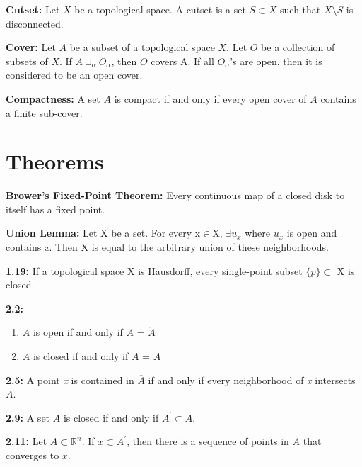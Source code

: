 \documentclass[letterpaper,12pt]{article}
\begin{document}
	\textbf{Cutset:}
		Let $X$ be a topological space. A cutset is a set $S\subset X$ such that $X\setminus S$ is disconnected.
	\newline{} 

	\textbf{Cover:}
		Let $A$ be a subset of a topological space $X$. Let $O$ be a collection of subsets of $X$. If $A\sqcup_\alpha O_\alpha$, then $O$ covers A. If all $O_\alpha$'s are open, then it is considered to be an open cover.
	\newline{}

	\textbf{Compactness:}
		A set $A$ is compact if and only if every open cover of $A$ contains a finite sub-cover.
	\newline{}


\section*{Theorems}

	\textbf{Brower's Fixed-Point Theorem:}
		Every continuous map of a closed disk to itself has a fixed point.
	\newline{}

	\textbf{Union Lemma:}
		Let X be a set. For every x$\in$X, $\exists u_x$ where $u_x$ is open and contains \emph{x}. Then X is equal to the arbitrary union of these neighborhoods.
	\newline{}

	\textbf{1.19:}
		If a topological space X is Hausdorff, every single-point subset $\{p\}\subset$ X is closed.
	\newline{}

	\textbf{2.2:}
	\begin{enumerate}
			\item $A$ is open if and only if $A$ = $\mathring{A}$
			\item $A$ is closed if and only if $A$ = $\overline{A}$
	\end{enumerate}

	\textbf{2.5:}
		A point \emph{x} is contained in $\overline{A}$ if and only if every neighborhood of \emph{x} intersects $A$.
	\newline{}

	\textbf{2.9:}
		A set $A$ is closed if and only if $A^{\prime}\subset A$.
	\newline{}

	\textbf{2.11:}
		Let $A\subset \mathbb{R}^{n}$. If $x\subset A^{\prime}$, then there is a sequence of points in $A$ that converges to $x$.
	\newline{}
\end{document}
